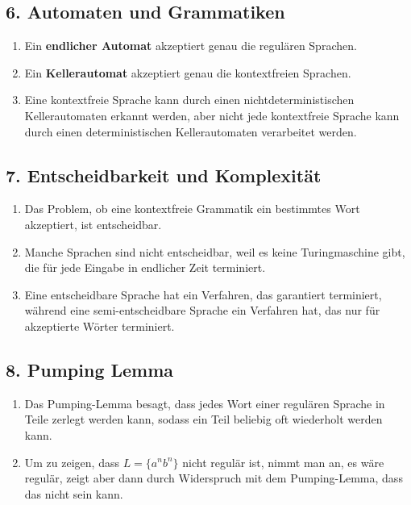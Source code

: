 \documentclass[a4paper,12pt]{article}
\begin{document}
	\subsection*{6. Automaten und Grammatiken}
	\begin{enumerate}
		\item Ein \textbf{endlicher Automat} akzeptiert genau die regulären Sprachen.
		
		\item Ein \textbf{Kellerautomat} akzeptiert genau die kontextfreien Sprachen.
		
		\item Eine kontextfreie Sprache kann durch einen nichtdeterministischen Kellerautomaten erkannt werden, aber nicht jede kontextfreie Sprache kann durch einen deterministischen Kellerautomaten verarbeitet werden.
	\end{enumerate}
	
	\subsection*{7. Entscheidbarkeit und Komplexität}
	\begin{enumerate}
		\item Das Problem, ob eine kontextfreie Grammatik ein bestimmtes Wort akzeptiert, ist entscheidbar.
		
		\item Manche Sprachen sind nicht entscheidbar, weil es keine Turingmaschine gibt, die für jede Eingabe in endlicher Zeit terminiert.
		
		\item Eine entscheidbare Sprache hat ein Verfahren, das garantiert terminiert, während eine semi-entscheidbare Sprache ein Verfahren hat, das nur für akzeptierte Wörter terminiert.
	\end{enumerate}
	
	\subsection*{8. Pumping Lemma}
	\begin{enumerate}
		\item Das Pumping-Lemma besagt, dass jedes Wort einer regulären Sprache in Teile zerlegt werden kann, sodass ein Teil beliebig oft wiederholt werden kann.
		
		\item Um zu zeigen, dass $L = \{ a^n b^n \}$ nicht regulär ist, nimmt man an, es wäre regulär, zeigt aber dann durch Widerspruch mit dem Pumping-Lemma, dass das nicht sein kann.
	\end{enumerate}
	
\end{document}
